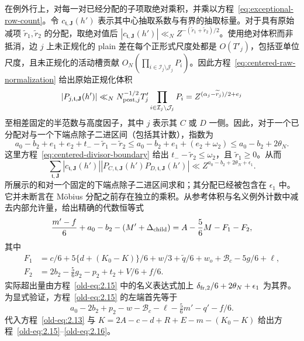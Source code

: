在例外行上，对每一对已经分配的子项取绝对乘积，并乘以方程~\eqref{eq:exceptional-row-count}。令 \(c_{\mathfrak t,\mathbf J}(h')\) 表示其中心抽取系数与有界的抽取标量。对于具有原始减项 \(\widetilde r_1,\widetilde r_2\) 的分配，取绝对值后 \(|c_{\mathfrak t,\mathbf J}(h')|\ll_N
 Z^{-(\widetilde r_1+\widetilde r_2)/2}\)。使用绝对体积而非抵消，边 \(j\) 上未正规化的 plain 差在每个正形式尺度处都是 \(O(T'_j)\)，包括亚单位尺度，且未正规化的活动槽贡献 \(O_N(\prod_{i\in\mathcal I_j\setminus\mathcal J_j}P_i)\)。因此方程~\eqref{eq:centered-raw-normalization} 给出原始正规化体积
\[
 |P_{j,\mathfrak t,\mathbf J}(h')|
 \ll_N N_{{\rm post},j}^{-1/2}T'_j
             \prod_{i\in\mathcal I_j\setminus\mathcal J_j}P_i
 =Z^{(\alpha_j-\widetilde r_j)/2+e_j}
\]
至相差固定的半范数与高度因子，其中 \(j\) 表示其 \(C\) 或 \(D\) 一侧。因此，对于一个已分配对与一个下端点除子二进区间（包括其计数），指数为
\[
 a_0-b_2+e_1+e_2+t_- -\widetilde r_1-\widetilde r_2
 \le a_0-b_2+e_1+(e_2+\omega_2)
 \le a_0-b_2+2\theta_N.
\]
这里方程~\eqref{eq:centered-divisor-boundary} 给出 \(t_- -\widetilde r_2\le\omega_2\)，且 \(\widetilde r_1\ge0\)。从而
\[
 \sum_{\mathfrak t,\mathbf J}
 |c_{\mathfrak t,\mathbf J}(h')|
 |P_{C,\mathfrak t,\mathbf J}(h')
       P_{D,\mathfrak t,\mathbf J}(h')|
 \ll Z^{a_0-b_2+2\theta_N+\epsilon_1}.
\]
所展示的和对一个固定的下端点除子二进区间求和；其分配已经被包含在 \(\epsilon_1\) 中。它并未断言在 M\"obius 分配之前存在独立的乘积。从参考体积与名义例外计数中减去内部允许量，给出精确的代数恒等式
\begin{equation}
 \frac{m'-f}{6}+a_0-b_2-(M'+\Delta_{\rm child})
 =A-\frac56M-F_1-F_2,
 \label{old-eq:2.15}
\end{equation}
其中
\begin{equation}
 \begin{aligned}
 F_1&=c/6+5\{d+(K_0-K)\}/6+w/3+\widetilde q/6
       +w_o+\mathcal B_c-5g/6+\ell,\\
 F_2&=2b_2-\tfrac56g_2-p_2+t_2+V/6+f/6.
 \end{aligned}
 \label{old-eq:2.16}
\end{equation}
实际超出量由方程~\eqref{old-eq:2.15} 中的名义表达式加上 \(\delta_{{\rm fr},2}/6+2\theta_N+\epsilon_1\) 为其界。
为显式验证，方程~\eqref{old-eq:2.15} 的左端首先等于
\[
 a_0-2b_2+p_2-w-\mathcal B_c-\ell
       -\tfrac56m'-q'-f/6.
\]
代入方程~\eqref{old-eq:2.13} 与 \(K=2A-c-d+R+E-m-(K_0-K)\) 给出方程~\eqref{old-eq:2.15}--\eqref{old-eq:2.16}。

